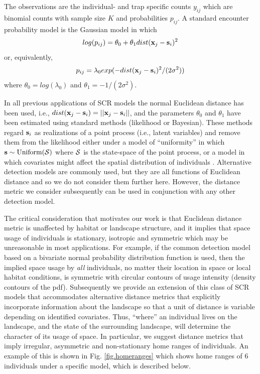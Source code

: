 \documentclass[12pt]{article}
\begin{document}
The observations are the individual- and trap specific counts $y_{ij}$
which are binomial counts with sample size $K$ and probabilities
$p_{ij}$. A standard encounter probability model
\citep{borchers_efford:2008} is the Gaussian model in which
\begin{equation}
log(p_{ij})= \theta_{0} + \theta_{1} dist({\bf x}_{j} - {\bf s}_{i})^{2}
\label{eq.encounter}
\end{equation}
or, equivalently,
\[
p_{ij} = \lambda_{0} exp(-  dist({\bf x}_{j} - {\bf s}_{i})^{2}
/(2\sigma^{2}) )
\]
where $\theta_{0} = log(\lambda_{0})$ and $\theta_{1} =
-1/(2\sigma^2)$.

In all previous applications of SCR models the normal Euclidean
distance has been used, i.e., $ dist({\bf x}_{j} - {\bf s}_{i}) =
||{\bf x}_{j} - {\bf s}_{i}||$, and the parameters $\theta_0$ and
$\theta_1$ have been estimated using standard methods (likelihood or
Bayesian). These methods regard ${\bf s}_{i}$ as realizations of a
point process (i.e., latent variables) and remove them from the
likelihood either under a model of ``uniformity'' in which ${\bf s}
\sim \mbox{Uniform}({\cal S})$ where ${\cal S}$ is the state-space of
the point process, or a model in which covariates might affect the spatial
distribution of individuals \citep{borchers_efford:2008}. Alternative detection
models are commonly used, but they are all functions of Euclidean
distance and so we do not consider them further here. However, the
distance metric we consider subsequently can be used in conjunction
with any other detection model.

The critical consideration that motivates our work is that
 Euclidean distance metric is unaffected by habitat or landscape
structure, and it implies that space usage of individuals is
stationary, isotropic and symmetric which may be unreasonable in most
applications.  For example, if the common detection model based on a
bivariate
normal probability distribution function is used, then the implied
space
usage by {\it all} individuals, no matter their location in space or
local habitat conditions, is symmetric with circular contours of
usage intensity (density contours of the pdf).
Subsequently we provide an extension of this class of SCR models that
accommodates alternative distance metrics that explicitly incorporate
information about the landscape so that a unit of distance is variable
depending on identified covariates. Thus, ``where'' an individual
lives on the landscape, and the state of the surrounding landscape,
will determine the character of its usage of space. In particular, we
suggest distance metrics that imply irregular, asymmetric and
non-stationary home ranges of individuals. An example of this is shown
in Fig. \ref{fig.homeranges} which shows home ranges of 6 individuals under
a specific model, which is described below.
\end{document}
